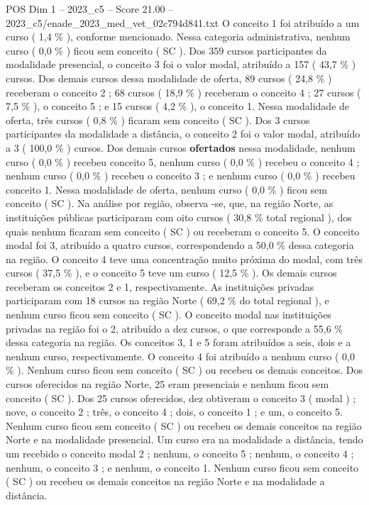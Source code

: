 \begin{textsample}{POS Dim 1 – 2023\_c5 – Score 21.00 – 2023\_c5/enade\_2023\_med\_vet\_02c794d841.txt}
O conceito 1 foi atribuído a um curso ( 1,4 \% ), conforme mencionado.
Nessa categoria administrativa, nenhum curso ( 0,0 \% ) ficou sem conceito ( SC ).
Dos 359 cursos participantes da modalidade presencial, o conceito 3 foi o valor modal, atribuído a 157 ( 43,7 \% ) cursos.
Dos demais cursos dessa modalidade de oferta, 89 cursos ( 24,8 \% ) receberam o conceito 2 ; 68 cursos ( 18,9 \% ) receberam o conceito 4 ; 27 cursos ( 7,5 \% ), o conceito 5 ; e 15 cursos ( 4,2 \% ), o conceito 1.
Nessa modalidade de oferta, três cursos ( 0,8 \% ) ficaram sem conceito ( SC ).
Dos 3 cursos participantes da modalidade a distância, o conceito 2 foi o valor modal, atribuído a 3 ( 100,0 \% ) cursos.
Dos demais cursos \textbf{ofertados} nessa modalidade, nenhum curso ( 0,0 \% ) recebeu conceito 5, nenhum curso ( 0,0 \% ) recebeu o conceito 4 ; nenhum curso ( 0,0 \% ) recebeu o conceito 3 ; e nenhum curso ( 0,0 \% ) recebeu conceito 1.
Nessa modalidade de oferta, nenhum curso ( 0,0 \% ) ficou sem conceito ( SC ).
Na análise por região, observa -se, que, na região Norte, as instituições públicas participaram com oito cursos ( 30,8 \% total regional ), dos quais nenhum ficaram sem conceito ( SC ) ou receberam o conceito 5.
O conceito modal foi 3, atribuído a quatro cursos, correspondendo a 50,0 \% dessa categoria na região.
O conceito 4 teve uma concentração muito próxima do modal, com três cursos ( 37,5 \% ), e o conceito 5 teve um curso ( 12,5 \% ).
Os demais cursos receberam os conceitos 2 e 1, respectivamente.
As instituições privadas participaram com 18 cursos na região Norte ( 69,2 \% do total regional ), e nenhum curso ficou sem conceito ( SC ).
O conceito modal nas instituições privadas na região foi o 2, atribuído a dez cursos, o que corresponde a 55,6 \% dessa categoria na região.
Os conceitos 3, 1 e 5 foram atribuídos a seis, dois e a nenhum curso, respectivamente.
O conceito 4 foi atribuído a nenhum curso ( 0,0 \% ).
Nenhum curso ficou sem conceito ( SC ) ou recebeu os demais conceitos.
Dos cursos oferecidos na região Norte, 25 eram presenciais e nenhum ficou sem conceito ( SC ).
Dos 25 cursos oferecidos, dez obtiveram o conceito 3 ( modal ) ; nove, o conceito 2 ; três, o conceito 4 ; dois, o conceito 1 ; e um, o conceito 5.
Nenhum curso ficou sem conceito ( SC ) ou recebeu os demais conceitos na região Norte e na modalidade presencial.
Um curso era na modalidade a distância, tendo um recebido o conceito modal 2 ; nenhum, o conceito 5 ; nenhum, o conceito 4 ; nenhum, o conceito 3 ; e nenhum, o conceito 1.
Nenhum curso ficou sem conceito ( SC ) ou recebeu os demais conceitos na região Norte e na modalidade a distância.

\end{textsample}
